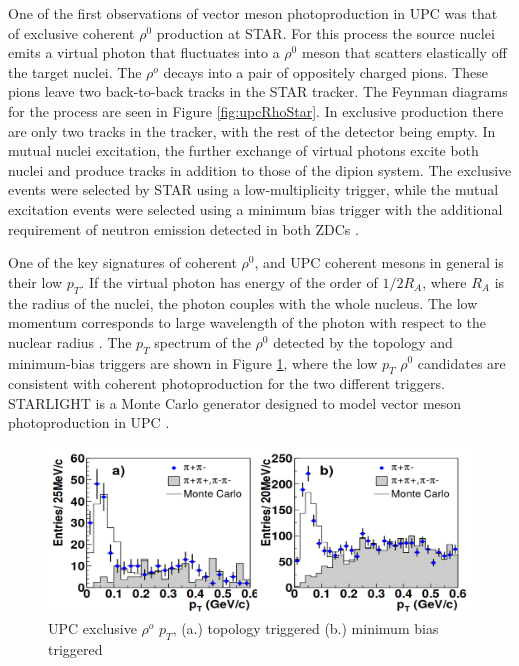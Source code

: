 One of the first observations of vector meson photoproduction in UPC was that of exclusive coherent $\rho^0$ production at STAR. For this process the source nuclei emits a virtual photon that fluctuates into a $\rho^0$ meson that scatters elastically off the target nuclei. The $\rho^o$ decays into a pair of oppositely charged pions. These pions leave two back-to-back tracks in the STAR tracker. The Feynman diagrams for the process are seen in Figure \ref{fig:upcRhoStar}. In exclusive production there are only two tracks in the tracker, with the rest of the detector being empty. In mutual nuclei excitation, the further exchange of virtual photons excite both nuclei and produce tracks in addition to those of the dipion system. The exclusive events were selected by STAR using a low-multiplicity trigger, while the mutual excitation events were selected using a minimum bias trigger with the additional requirement of neutron emission detected in both ZDCs \cite{Adler:2002sc}. 

One of the key signatures of coherent $\rho^0$, and UPC coherent mesons in general is their low $p_T$. If the virtual photon has energy of the order of $1/2R_{A}$, where $R_{A}$ is the radius of the nuclei, the photon couples with the whole nucleus. The low momentum corresponds to large wavelength of the photon with respect to the nuclear radius \cite{Guzey:2013taa,Frankfurt:2006wg,Baltz:2002pp,Klein:2003vd}. The $p_T$ spectrum of the $\rho^0$ detected by the topology and minimum-bias triggers are shown in Figure \ref{fig:upcRhoStarPt}, where the low $p_T$ $\rho^0$ candidates are consistent with coherent photoproduction for the two different triggers. STARLIGHT is a Monte Carlo generator designed to model vector meson photoproduction in UPC \cite{starlight}.

\begin{figure}[h!]
\begin{centering}
\includegraphics[width=5.5in]{Chapter2/importfigs/rho_upc_pt_star.png}
\par\end{centering}
\caption{UPC exclusive $\rho^o$ $p_T$, (a.) topology triggered (b.) minimum bias triggered \cite{Adler:2002sc} \label{fig:upcRhoStarPt}}
\end{figure}

